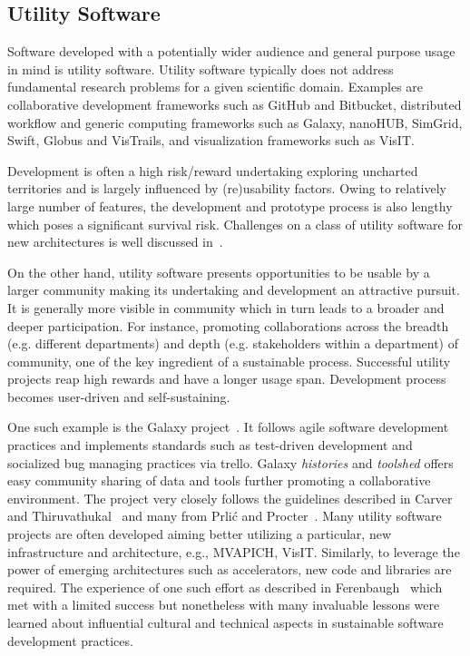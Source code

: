 \documentclass[11pt, oneside]{amsart}
\newcommand{\toolname}[1] {\textsf{#1}}
\begin{document}
\subsection{Utility Software}
Software developed with a potentially wider audience and general purpose usage
in mind is utility software. Utility software typically does not address
fundamental research problems for a given scientific domain. Examples are
collaborative development frameworks such as \toolname{GitHub} and
\toolname{Bitbucket}, distributed workflow and generic computing frameworks
such as \toolname{Galaxy}, \toolname{nanoHUB}, \toolname{SimGrid}, \toolname{Swift},
\toolname{Globus} and \toolname{VisTrails}, and visualization frameworks such as
\toolname{VisIT}. 

Development is often a high risk/reward undertaking exploring uncharted
territories and is largely influenced by (re)usability factors. Owing to
relatively large number of features, the development and prototype process is
also lengthy which poses a significant survival risk. Challenges on a class of
utility software for new architectures is well discussed
in~\cite{Ferenbaugh_WSSSPE}.

On the other hand, utility software presents opportunities to be usable by a
larger community making its undertaking and development an attractive pursuit.
It is generally more visible in community which in turn leads to a broader and
deeper participation. For instance, promoting collaborations across the breadth
(e.g.  different departments) and depth (e.g. stakeholders within a department)
of community, one of the key ingredient of a sustainable process. Successful
utility projects reap high rewards and have a longer usage span. Development
process becomes user-driven and self-sustaining.

One such example is the \toolname{Galaxy} project~\cite{Galaxy}. It follows agile software
development practices and implements standards such as test-driven development
and socialized bug managing practices via \toolname{trello}. Galaxy
\emph{histories} and \emph{toolshed} offers easy community sharing of data and
tools further promoting a collaborative environment. The project very closely
follows the guidelines described in Carver and Thiruvathukal~\cite{Carver_WSSSPE} and many
from Prli\'{c} and Procter~\cite{Prlic_WSSSPE}. Many utility software projects are often developed
aiming better utilizing a particular, new infrastructure and architecture,
e.g., \toolname{MVAPICH}, \toolname{VisIT}. Similarly, to leverage the power of
emerging architectures such as accelerators, new code and libraries are
required. The experience of one such effort as described
in Ferenbaugh~\cite{Ferenbaugh_WSSSPE} which met with a limited success but nonetheless
with many invaluable lessons were learned about influential cultural and
technical aspects in sustainable software development practices.
\end{document}
